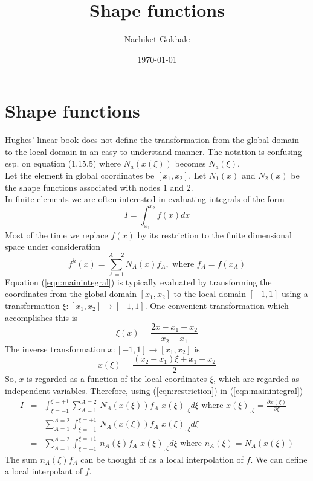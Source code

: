 \documentclass{article}
\newcommand{\beq}{\begin{equation}}
\newcommand{\eeq}{\end{equation}}
\newcommand{\ber}{\begin{eqnarray}}
\newcommand{\eer}{\end{eqnarray}}
\begin{document}
\title{Shape functions}
\author{Nachiket Gokhale}
\date{\today}
\maketitle
\section{Shape functions}
Hughes' linear book does not define the transformation from the global domain to the local domain in an easy to understand manner. The notation is confusing esp. on equation (1.15.5) where $N_a(x(\xi))$ becomes $N_a(\xi)$. \\
Let the element in global coordinates be $[x_1,x_2]$. Let $N_1(x)$ and $N_2(x)$ be the shape functions associated with nodes $1$ and $2$. \\
In finite elements we are often interested in evaluating integrals of the form
\begin{equation}
  \label{eqn:mainintegral}
  I=\int_{x_1}^{x_2}f(x)dx
\end{equation}
Most of the time we replace $f(x)$ by its restriction to the finite dimensional space under consideration
\begin{equation}
  \label{eqn:restriction}
f^h(x)=\sum_{A=1}^{A=2}N_{A}(x)f_{A},\text{ where } f_A=f(x_A)
\end{equation}
Equation (\ref{eqn:mainintegral}) is typically evaluated by transforming the coordinates from the global domain $[x_1,x_2]$ to the local domain $[-1,1]$ using a transformation $\xi:[x_1,x_2]\rightarrow[-1,1]$. One convenient transformation which accomplishes this is
\beq
\label{eqn:globaltolocal}
\xi(x) = \frac{2x -x_1 - x_2}{x_2-x_1}
\eeq
The inverse transformation $x:[-1,1]\rightarrow[x_1,x_2]$ is
\beq
\label{eqn:localtoglobal}
x(\xi) = \frac{(x_2 - x_1)\xi + x_1 + x_2}{2}
\eeq
So, $x$ is regarded as a function of the local coordinates $\xi$, which are regarded as independent variables. Therefore, using (\ref{eqn:restriction}) in (\ref{eqn:mainintegral})
\ber
I &=& \int_{\xi=-1}^{\xi=+1}\sum_{A=1}^{A=2}\,N_{A}(x(\xi))f_{A}\,\, x(\xi)_{,\xi} d\xi \text{ where } x(\xi)_{,\xi}=\frac{\partial x(\xi)}{\partial \xi} \nonumber \\
&=&  \sum_{A=1}^{A=2}\int_{\xi=-1}^{\xi=+1}\,N_{A}(x(\xi))f_{A}\,\, x(\xi)_{,\xi} d\xi \nonumber \\
&=&  \sum_{A=1}^{A=2}\int_{\xi=-1}^{\xi=+1}\,n_{A}(\xi)f_{A}\,\, x(\xi)_{,\xi} d\xi \text{ where } n_A(\xi)=N_A(x(\xi)) \label{eqn:localintegral}
\eer
The sum $n_A(\xi)f_A$ can be thought of as a local interpolation of $f$. We can define a local interpolant of $f$.
\end{document}
